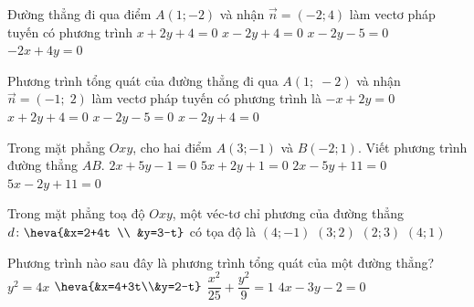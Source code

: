 \begin{ex}%
	Đường thẳng đi qua điểm $A\left(1;-2\right)$  và nhận $\overrightarrow{n}=\left(-2;4\right)$ làm vectơ pháp tuyến có phương trình
	 \choice
		 {$x+2 y+4=0$}
		{$x-2 y+4=0$} 
		{\True  $x-2 y-5=0$}
		{$-2  x+4 y=0$}
\end{ex}

\begin{ex}%
	Phương trình tổng quát của đường thẳng đi qua $A\left(1;\;-2\right)$ và nhận $\overrightarrow{n}=\left(-1;\; 2\right)$ làm vectơ pháp tuyến có  phương trình là
	 \choice
		 {$-x+2y=0$}
		 {$x+2y+4=0$}
		{\True  $x-2y-5=0$}
		{$x-2y+4=0$} 
\end{ex}

\begin{ex}%
	Trong mặt phẳng $Oxy$, cho hai điểm $A(3;-1)$ và  $B(-2;1)$. Viết phương trình đường thẳng $AB$.
	 \choice
		 {\True $2x+5y-1=0$}
		{$5x+2y+1=0$} 
		{$2x-5y+11=0$} 
		 {$5x-2y+11=0$}
\end{ex}

\begin{ex}%
	Trong mặt phẳng toạ độ $Oxy$, một véc-tơ chỉ phương của đường thẳng $ d \colon \heva{&x=2+4t \\ &y=3-t}$ có tọa  độ là
	\choice 
		 {\True $(4;-1)$}
		 {$(3;2)$}
		{$(2;3)$} 
		 {$(4;1)$}
\end{ex}

\begin{ex}%
	Phương  trình nào sau đây là phương trình tổng quát của một đường thẳng?
	 \choice
		{$y^2=4x$} 
		{$\heva{&x=4+3t\\&y=2-t}$} 
		 {$\dfrac{x^2}{25}+\dfrac{y^2}{9}=1$}
		{\True $4x-3y-2=0$} 
\end{ex}


